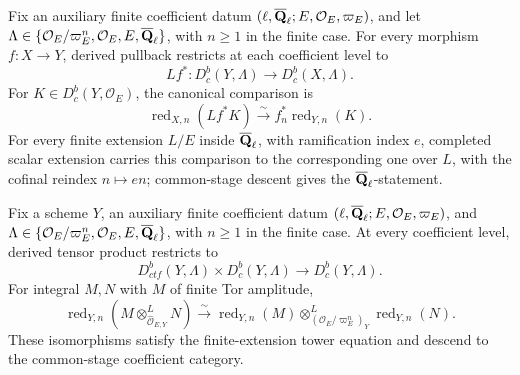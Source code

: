 \begin{proposition}
\label{prop:pullback-constructibility}


Fix an auxiliary finite coefficient datum
\((\ell,\overline{\mathbf Q}_\ell;E,\mathcal O_E,\varpi_E)\), and let
\(\Lambda\in\{\mathcal O_E/\varpi_E^n,\mathcal O_E,E,\overline{\mathbf Q}_\ell\}\), with
\(n\geq1\) in the finite case.  For every morphism \(f:X\to Y\), derived
pullback restricts at each
coefficient level to
\[
 Lf^*:D^b_c(Y,\Lambda)\longrightarrow D^b_c(X,\Lambda).
\]
For \(K\in D^b_c(Y,\mathcal O_E)\), the canonical comparison is
\[
 \operatorname{red}_{X,n}(Lf^*K)
 \xrightarrow{\sim}f_n^*\operatorname{red}_{Y,n}(K).
\]
For every finite extension \(L/E\) inside \(\overline{\mathbf Q}_\ell\), with ramification
index \(e\), completed scalar extension carries this comparison to the
corresponding one over \(L\), with the cofinal reindex \(n\mapsto en\);
common-stage descent gives the \(\overline{\mathbf Q}_\ell\)-statement.
\end{proposition}


\begin{proposition}
\label{prop:tensor-constructibility}


Fix a scheme \(Y\), an auxiliary finite coefficient datum
\((\ell,\overline{\mathbf Q}_\ell;E,\mathcal O_E,\varpi_E)\), and
\(\Lambda\in\{\mathcal O_E/\varpi_E^n,\mathcal O_E,E,\overline{\mathbf Q}_\ell\}\), with
\(n\geq1\) in the finite case.  At every coefficient level, derived tensor
product restricts to
\[
 D^b_{ctf}(Y,\Lambda)\times D^b_c(Y,\Lambda)
 \longrightarrow D^b_c(Y,\Lambda).
\]
For integral \(M,N\) with \(M\) of finite Tor amplitude,
\[
 \operatorname{red}_{Y,n}(M\otimes^L_{\widehat{\mathcal O}_{E,Y}}N)
 \xrightarrow{\sim}
 \operatorname{red}_{Y,n}(M)
 \otimes^L_{(\mathcal O_E/\varpi_E^n)_Y}
 \operatorname{red}_{Y,n}(N).
\]
These isomorphisms satisfy the finite-extension tower equation and descend
to the common-stage coefficient category.
\end{proposition}


